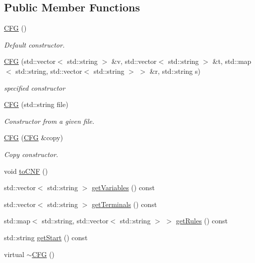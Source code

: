 \subsection*{\-Public \-Member \-Functions}
\begin{DoxyCompactItemize}
\item 
\hyperlink{classGrammar_1_1CFG_a2514d591306a5a473cf5fb7526a553fe}{\-C\-F\-G} ()
\begin{DoxyCompactList}\small\item\em \-Default constructor. \end{DoxyCompactList}\item 
\hyperlink{classGrammar_1_1CFG_ac2ad8201bf4de4991d2abcd62f74cddd}{\-C\-F\-G} (std\-::vector$<$ std\-::string $>$ \&v, std\-::vector$<$ std\-::string $>$ \&t, std\-::map$<$ std\-::string, std\-::vector$<$ std\-::string $>$ $>$ \&r, std\-::string s)
\begin{DoxyCompactList}\small\item\em specified constructor \end{DoxyCompactList}\item 
\hyperlink{classGrammar_1_1CFG_aa8d52c4cdfb2a0ef3d1c49148840d333}{\-C\-F\-G} (std\-::string file)
\begin{DoxyCompactList}\small\item\em \-Constructor from a given file. \end{DoxyCompactList}\item 
\hyperlink{classGrammar_1_1CFG_aae4104b0c6f695fa90c2c4a9651b9ac3}{\-C\-F\-G} (\hyperlink{classGrammar_1_1CFG}{\-C\-F\-G} \&copy)
\begin{DoxyCompactList}\small\item\em \-Copy constructor. \end{DoxyCompactList}\item 
void \hyperlink{classGrammar_1_1CFG_ad9c501567ec736260bde8f4076c63a4b}{to\-C\-N\-F} ()
\item 
std\-::vector$<$ std\-::string $>$ \hyperlink{classGrammar_1_1CFG_af0abdc0e7b98c2b735b946261b694ce0}{get\-Variables} () const 
\item 
std\-::vector$<$ std\-::string $>$ \hyperlink{classGrammar_1_1CFG_a4befeaba70b5455e94975670f3d83ba0}{get\-Terminals} () const 
\item 
std\-::map$<$ std\-::string, \*
std\-::vector$<$ std\-::string $>$ $>$ \hyperlink{classGrammar_1_1CFG_a7b964a01cb216bc2c67688724f6058f0}{get\-Rules} () const 
\item 
std\-::string \hyperlink{classGrammar_1_1CFG_a667a1d9eba1917ebe2cd7a63e2d6ffa8}{get\-Start} () const 
\item 
virtual \hyperlink{classGrammar_1_1CFG_a874ad3df12e1f3fd0cd49ad3e9855a45}{$\sim$\-C\-F\-G} ()
\end{DoxyCompactItemize}
